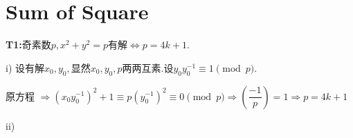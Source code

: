 
\section{Sum of Square}

{\bf T1:}奇素数$ p,x^2 + y^2 = p$有解$ \Leftrightarrow p = 4k + 1$.

i) 设有解$ x_0, y_0,$显然$ x_0,y_0,p$两两互素.设$ y_0y_0^{-1} \equiv 1 \pmod p$.

原方程 $ \Rightarrow (x_0y_0^{-1})^2 + 1 \equiv p(y_0^{-1})^2 \equiv 0\pmod p\Rightarrow (\dfrac{-1}{p}) = 1\Rightarrow p = 4k +  1$

ii)
